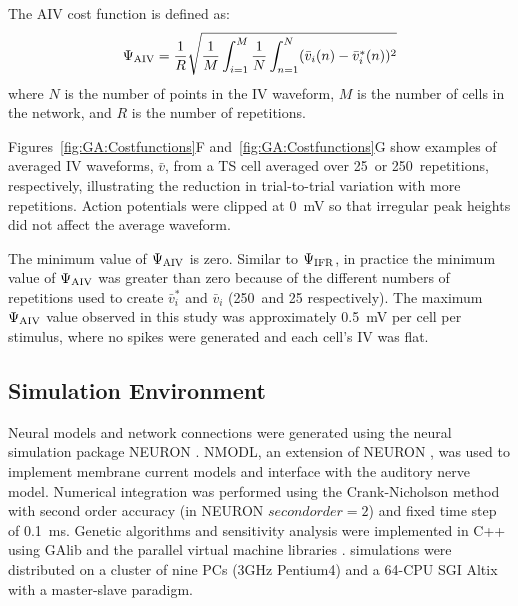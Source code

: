 \smallskip{}

The AIV cost function is defined as:
\begin{equation} \label{eq:GA:4} 
\Psi_{{\rm AIV}} =\frac{1}{R}
  \sqrt{\frac{1}{M} \int_{i=1}^{M}\frac{1}{N}
    \int_{n=1}^{N}(\bar{v}_{i} (n)-\bar{v}_{i}^{*} (n))^{2} }
\end{equation}
\noindent where $N$ is the number of points in the IV waveform, $M$ is
the number of cells in the network, and $R$ is the number of
repetitions.

\smallskip{}

Figures~\ref{fig:GA:Costfunctions}F and~\ref{fig:GA:Costfunctions}G
show examples of averaged IV waveforms, $\bar{v}$, from a TS cell
averaged over 25~or 250~repetitions, respectively, illustrating the
reduction in trial-to-trial variation with more repetitions. Action
potentials were clipped at 0~mV so that irregular peak heights did not
affect the average waveform.

\smallskip{}

The minimum value of $\Psi_{{\rm AIV}}$ is zero.  Similar to
$\Psi_{{\rm IFR}}$, in practice the minimum value of $\Psi_{{\rm
    AIV}}$ was greater than zero because of the different numbers of
repetitions used to create $\bar{v}_{i}^{*} $ and $\bar{v}_{i}$
(250~and 25 respectively). The maximum $\Psi_{{\rm AIV}}$ value
observed in this study was approximately 0.5~mV per cell per stimulus,
where no spikes were generated and each cell's IV was flat.



\subsection{Simulation Environment}\label{sec:GA:simul-envir}

Neural models and network connections were generated using the neural
simulation package NEURON \citep{CarnevaleHines:2006}. NMODL, an
extension of NEURON \citep{HinesCarnevale:2000}, was used to implement
membrane current models and interface with the auditory nerve
model. Numerical integration was performed using the Crank-Nicholson
method with second order accuracy (in NEURON $secondorder=2$) and
fixed time step of 0.1~ms. Genetic algorithms and sensitivity analysis
were implemented in C++ using GAlib \citep{Wall:2006} and the parallel
virtual machine libraries \citep{GeistBeguelinEtAl:1994}. {\GA}
simulations were distributed on a cluster of nine PCs (3GHz Pentium4)
and a 64-CPU SGI Altix with a master-slave paradigm.

